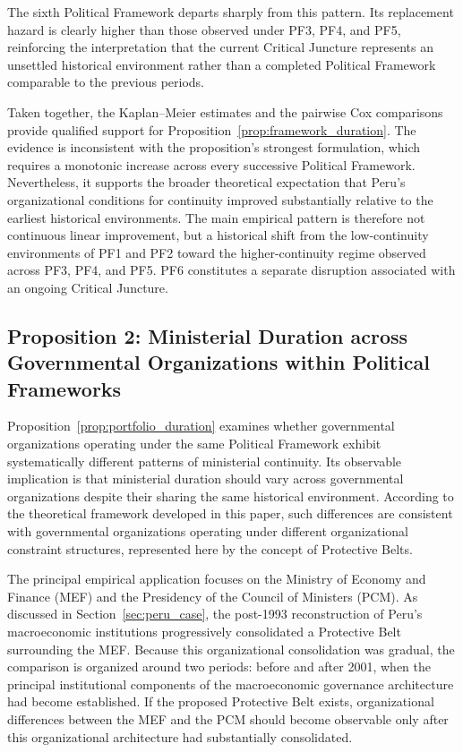 \documentclass[doc, 12pt, a4paper,floatsintext]{apa7}
\begin{document}
The sixth Political Framework departs sharply from this pattern. Its replacement hazard is clearly higher than those observed under PF3, PF4, and PF5, reinforcing the interpretation that the current Critical Juncture represents an unsettled historical environment rather than a completed Political Framework comparable to the previous periods.

Taken together, the Kaplan--Meier estimates and the pairwise Cox comparisons provide qualified support for Proposition~\ref{prop:framework_duration}. The evidence is inconsistent with the proposition's strongest formulation, which requires a monotonic increase across every successive Political Framework. Nevertheless, it supports the broader theoretical expectation that Peru's organizational conditions for continuity improved substantially relative to the earliest historical environments. The main empirical pattern is therefore not continuous linear improvement, but a historical shift from the low-continuity environments of PF1 and PF2 toward the higher-continuity regime observed across PF3, PF4, and PF5. PF6 constitutes a separate disruption associated with an ongoing Critical Juncture.
%


\subsection{Proposition 2: Ministerial Duration across Governmental Organizations within Political Frameworks}

Proposition~\ref{prop:portfolio_duration} examines whether governmental organizations operating under the same Political Framework exhibit systematically different patterns of ministerial continuity. Its observable implication is that ministerial duration should vary across governmental organizations despite their sharing the same historical environment. According to the theoretical framework developed in this paper, such differences are consistent with governmental organizations operating under different organizational constraint structures, represented here by the concept of Protective Belts.

The principal empirical application focuses  on the Ministry of Economy and Finance (MEF) and the Presidency of the Council of Ministers (PCM). As discussed in Section~\ref{sec:peru_case}, the post-1993 reconstruction of Peru's macroeconomic institutions progressively consolidated a Protective Belt surrounding the MEF. Because this organizational consolidation was gradual, the comparison is organized around two periods: before and after 2001, when the principal institutional components of the macroeconomic governance architecture had become established. If the proposed Protective Belt exists, organizational differences between the MEF and the PCM should become observable only after this organizational architecture had substantially consolidated.
\end{document}
